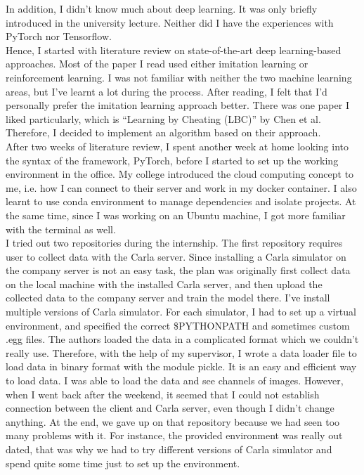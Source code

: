 \documentclass[inputenc=utf8]{ldvarticle}
\begin{document}
\noindent In addition, I didn’t know much about deep learning. It was only briefly introduced in the university lecture. Neither did I have the experiences with PyTorch nor Tensorflow.
\\

\noindent Hence, I started with literature review on state-of-the-art deep learning-based approaches. Most of the paper I read used either imitation learning or reinforcement learning. I was not familiar with neither the two machine learning areas, but I’ve learnt a lot during the process. After reading, I felt that I’d personally prefer the imitation learning approach better. There was one paper I liked particularly, which is “Learning by Cheating (LBC)” by Chen et al. Therefore, I decided to implement an algorithm based on their approach.
\\

\noindent After two weeks of literature review, I spent another week at home looking into the syntax of the framework, PyTorch, before I started to set up the working environment in the office. My college introduced the cloud computing concept to me, i.e. how I can connect to their server and work in my docker container. I also learnt to use conda environment to manage dependencies and isolate projects. At the same time, since I was working on an Ubuntu machine, I got more familiar with the terminal as well.
\\

\noindent I tried out two repositories during the internship. The first repository requires user to collect data with the Carla server. Since installing a Carla simulator on the company server is not an easy task, the plan was originally first collect data on the local machine with the installed Carla server, and then upload the collected data to the company server and train the model there. I’ve install multiple versions of Carla simulator. For each simulator, I had to set up a virtual environment, and specified the correct \$PYTHONPATH and sometimes custom .egg files. The authors loaded the data in a complicated format which we couldn’t really use. Therefore, with the help of my supervisor, I wrote a data loader file to load data in binary format with the module pickle. It is an easy and efficient way to load data. I was able to load the data and see channels of images. However, when I went back after the weekend, it seemed that I could not establish connection between the client and Carla server, even though I didn’t change anything. At the end, we gave up on that repository because we had seen too many problems with it. For instance, the provided environment was really out dated, that was why we had to try different versions of Carla simulator and spend quite some time just to set up the environment.
\\
\end{document}
